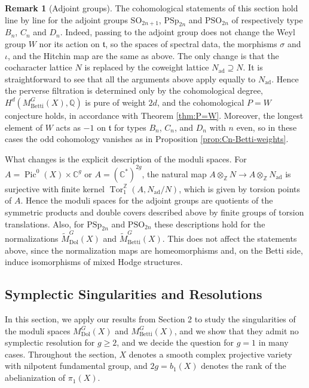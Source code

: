 \documentclass[11pt, a4paper]{amsart}
\theoremstyle{definition}
\newtheorem{remark}[theorem]{Remark}
\theoremstyle{myitemstyle}
\newcommand{\Z}{\mathbb{Z}}
\newcommand{\Q}{\mathbb{Q}}
\newcommand{\C}{\mathbb{C}}
\DeclareMathOperator{\Pic}{Pic}
\newcommand{\Dol}{{\mathrm{Dol}}}
\newcommand{\Betti}{{\mathrm{Betti}}}
\begin{document}
\begin{remark}[Adjoint groups]
\label{rem:adjoint groups}
The cohomological statements of this section hold line by line for the adjoint groups $\mathrm{SO}_{2n+1}$, $\mathrm{PSp}_{2n}$ and $\mathrm{PSO}_{2n}$ of respectively type $B_n$, $C_n$ and $D_n$. Indeed, passing to the adjoint group does not change the Weyl group $W$ nor its action on $\mathfrak t$, so the spaces of spectral data, the morphisms $\sigma$ and $\iota$, and the Hitchin map are the same as above. The only change is that the cocharacter lattice $N$ is replaced by the coweight lattice $N_{\mathrm{ad}}\supseteq N$. It is straightforward to see that all the arguments above apply equally to $N_{\mathrm{ad}}$. Hence the perverse filtration is determined only by the cohomological degree, $H^d(M^G_\Betti(X),\Q)$ is pure of weight $2d$, and the cohomological $P=W$ conjecture holds, in accordance with Theorem \ref{thm:P=W}. Moreover, the longest element of $W$ acts as $-1$ on $\mathfrak t$ for types $B_n$, $C_n$, and $D_n$ with $n$ even, so in these cases the odd cohomology vanishes as in Proposition \ref{prop:Cn-Betti-weights}.

What changes is the explicit description of the moduli spaces. For $A=\Pic^0(X)\times\C^g$ or $A=(\C^*)^{2g}$, the natural map $A\otimes_\Z N\to A\otimes_\Z N_{\mathrm{ad}}$ is surjective with finite kernel $\operatorname{Tor}_1^\Z(A,N_{\mathrm{ad}}/N)$, which is given by torsion points of $A$. Hence the moduli spaces for the adjoint groups are quotients of the symmetric products and double covers described above by finite groups of torsion translations.
Also, for $\mathrm{PSp}_{2n}$ and $\mathrm{PSO}_{2n}$ these descriptions hold for the normalizations $\widetilde M^G_\Dol(X)$ and $\widetilde M^G_\Betti(X)$. This does not affect the statements above, since the normalization maps are homeomorphisms and, on the Betti side, induce isomorphisms of mixed Hodge structures.
\end{remark}

\subsection{Symplectic Singularities and Resolutions}
\label{sec:symplectic-resolutions}

In this section, we apply our results from Section 2 to study the singularities of the moduli spaces $M^G_\Dol(X)$ and $M^G_\Betti(X)$, and we show that they admit no symplectic resolution for $g\geq 2$, and we decide the question for $g=1$ in many cases. Throughout the section, $X$ denotes a smooth complex projective variety with nilpotent fundamental group, and $2g=b_1(X)$ denotes the rank of the abelianization of $\pi_1(X)$.
\end{document}
